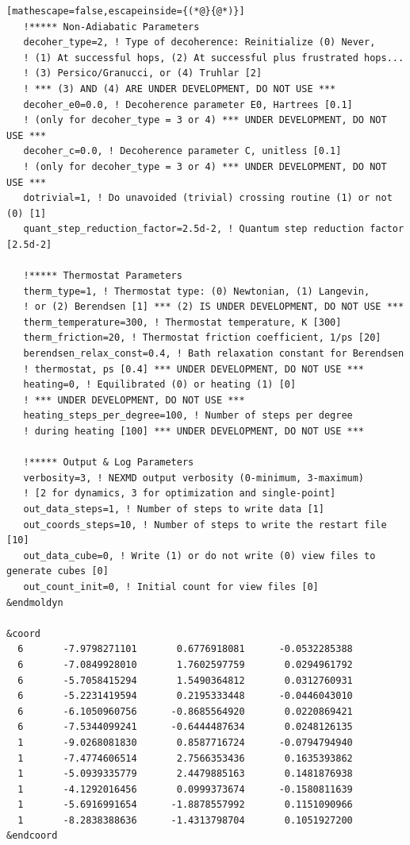 \documentclass[letterpaper,12pt,titlepage]{article}
\begin{document}
\begin{appendix}
\begin{lstlisting}[mathescape=false,escapeinside={(*@}{@*)}]
   !***** Non-Adiabatic Parameters
   decoher_type=2, ! Type of decoherence: Reinitialize (0) Never, 
   ! (1) At successful hops, (2) At successful plus frustrated hops... 
   ! (3) Persico/Granucci, or (4) Truhlar [2]
   ! *** (3) AND (4) ARE UNDER DEVELOPMENT, DO NOT USE ***
   decoher_e0=0.0, ! Decoherence parameter E0, Hartrees [0.1]
   ! (only for decoher_type = 3 or 4) *** UNDER DEVELOPMENT, DO NOT USE ***
   decoher_c=0.0, ! Decoherence parameter C, unitless [0.1]
   ! (only for decoher_type = 3 or 4) *** UNDER DEVELOPMENT, DO NOT USE ***
   dotrivial=1, ! Do unavoided (trivial) crossing routine (1) or not (0) [1]
   quant_step_reduction_factor=2.5d-2, ! Quantum step reduction factor [2.5d-2]

   !***** Thermostat Parameters
   therm_type=1, ! Thermostat type: (0) Newtonian, (1) Langevin, 
   ! or (2) Berendsen [1] *** (2) IS UNDER DEVELOPMENT, DO NOT USE ***
   therm_temperature=300, ! Thermostat temperature, K [300]
   therm_friction=20, ! Thermostat friction coefficient, 1/ps [20]
   berendsen_relax_const=0.4, ! Bath relaxation constant for Berendsen 
   ! thermostat, ps [0.4] *** UNDER DEVELOPMENT, DO NOT USE ***
   heating=0, ! Equilibrated (0) or heating (1) [0]
   ! *** UNDER DEVELOPMENT, DO NOT USE ***
   heating_steps_per_degree=100, ! Number of steps per degree
   ! during heating [100] *** UNDER DEVELOPMENT, DO NOT USE ***

   !***** Output & Log Parameters
   verbosity=3, ! NEXMD output verbosity (0-minimum, 3-maximum)
   ! [2 for dynamics, 3 for optimization and single-point]
   out_data_steps=1, ! Number of steps to write data [1]
   out_coords_steps=10, ! Number of steps to write the restart file [10]
   out_data_cube=0, ! Write (1) or do not write (0) view files to generate cubes [0]
   out_count_init=0, ! Initial count for view files [0]
&endmoldyn

&coord
  6       -7.9798271101       0.6776918081      -0.0532285388
  6       -7.0849928010       1.7602597759       0.0294961792
  6       -5.7058415294       1.5490364812       0.0312760931
  6       -5.2231419594       0.2195333448      -0.0446043010
  6       -6.1050960756      -0.8685564920       0.0220869421
  6       -7.5344099241      -0.6444487634       0.0248126135
  1       -9.0268081830       0.8587716724      -0.0794794940
  1       -7.4774606514       2.7566353436       0.1635393862
  1       -5.0939335779       2.4479885163       0.1481876938
  1       -4.1292016456       0.0999373674      -0.1580811639
  1       -5.6916991654      -1.8878557992       0.1151090966
  1       -8.2838388636      -1.4313798704       0.1051927200
&endcoord


\end{lstlisting}
\end{appendix}
\end{document}
